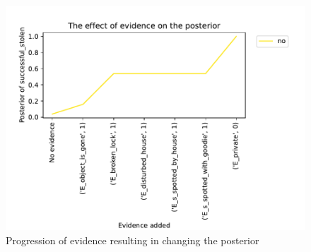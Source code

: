 \begin{enumerate}
\begin{figure}[htbp]
 \centering
\includegraphics[width=0.6\linewidth]{../experiments/StolenLaptop/plots/posterior_base_networkStolenLaptop.pdf}
\caption{ Progression of evidence resulting in changing the posterior}
\label{baseposterior}
\end{figure}%


\end{enumerate}

